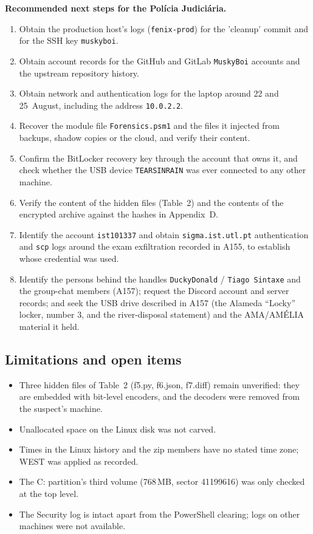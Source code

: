 \documentclass[11pt,a4paper,final,oneside]{article}
\begin{document}
\textbf{Recommended next steps for the Polícia Judiciária.}
\begin{enumerate}
  \item Obtain the production host's logs (\texttt{fenix-prod}) for the 'cleanup' commit and for the SSH key \texttt{muskyboi}.
  \item Obtain account records for the GitHub and GitLab \texttt{MuskyBoi} accounts and the upstream repository history.
  \item Obtain network and authentication logs for the laptop around 22 and 25~August, including the address \texttt{10.0.2.2}.
  \item Recover the module file \texttt{Forensics.psm1} and the files it injected from backups, shadow copies or the cloud, and verify their content.
  \item Confirm the BitLocker recovery key through the account that owns it, and check whether the USB device \texttt{TEARSINRAIN} was ever connected to any other machine.
  \item Verify the content of the hidden files (Table~2) and the contents of the encrypted archive against the hashes in Appendix~D.
  \item Identify the account \texttt{ist101337} and obtain \texttt{sigma.ist.utl.pt} authentication and \texttt{scp} logs around the exam exfiltration recorded in A155, to establish whose credential was used.
  \item Identify the persons behind the handles \texttt{DuckyDonald} / \texttt{Tiago Sintaxe} and the group-chat members (A157); request the Discord account and server records; and seek the USB drive described in A157 (the Alameda ``Locky'' locker, number 3, and the river-disposal statement) and the AMA/AMÉLIA material it held.
\end{enumerate}

\subsection{Limitations and open items}

\begin{itemize}
  \item Three hidden files of Table~2 (f5.py, f6.json, f7.diff) remain unverified: they are embedded with bit-level encoders, and the decoders were removed from the suspect's machine.
  \item Unallocated space on the Linux disk was not carved.
  \item Times in the Linux history and the zip members have no stated time zone; WEST was applied as recorded.
  \item The C: partition's third volume (768\,MB, sector 41199616) was only checked at the top level.
  \item The Security log is intact apart from the PowerShell clearing; logs on other machines were not available.
\end{itemize}
\end{document}
